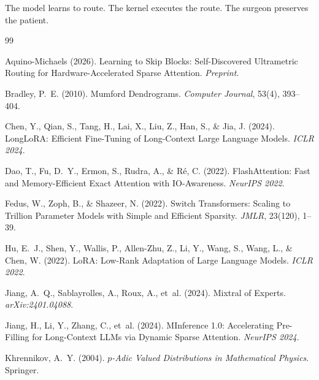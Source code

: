 \documentclass[11pt,a4paper]{article}
\begin{document}
The model learns to route. The kernel executes the route. The surgeon preserves the patient.



\begin{thebibliography}{99}

Aquino-Michaels (2026).
\newblock Learning to Skip Blocks: Self-Discovered Ultrametric Routing for Hardware-Accelerated Sparse Attention.
\newblock \emph{Preprint}.

Bradley, P.~E. (2010).
\newblock Mumford Dendrograms.
\newblock \emph{Computer Journal}, 53(4), 393--404.

Chen, Y., Qian, S., Tang, H., Lai, X., Liu, Z., Han, S., \& Jia, J. (2024).
\newblock LongLoRA: Efficient Fine-Tuning of Long-Context Large Language Models.
\newblock \emph{ICLR 2024}.

Dao, T., Fu, D.~Y., Ermon, S., Rudra, A., \& R\'{e}, C. (2022).
\newblock FlashAttention: Fast and Memory-Efficient Exact Attention with IO-Awareness.
\newblock \emph{NeurIPS 2022}.

Fedus, W., Zoph, B., \& Shazeer, N. (2022).
\newblock Switch Transformers: Scaling to Trillion Parameter Models with Simple and Efficient Sparsity.
\newblock \emph{JMLR}, 23(120), 1--39.

Hu, E.~J., Shen, Y., Wallis, P., Allen-Zhu, Z., Li, Y., Wang, S., Wang, L., \& Chen, W. (2022).
\newblock LoRA: Low-Rank Adaptation of Large Language Models.
\newblock \emph{ICLR 2022}.

Jiang, A.~Q., Sablayrolles, A., Roux, A., et~al. (2024).
\newblock Mixtral of Experts.
\newblock \emph{arXiv:2401.04088}.

Jiang, H., Li, Y., Zhang, C., et~al. (2024).
\newblock MInference 1.0: Accelerating Pre-Filling for Long-Context LLMs via Dynamic Sparse Attention.
\newblock \emph{NeurIPS 2024}.

Khrennikov, A.~Y. (2004).
\newblock \emph{$p$-Adic Valued Distributions in Mathematical Physics}.
\newblock Springer.


\end{thebibliography}
\end{document}
